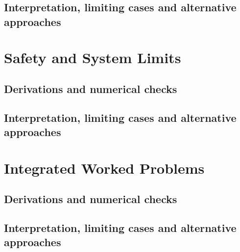 \subsection{Interpretation, limiting cases and alternative approaches}
\par\pagebreak[1]

\section{Safety and System Limits}
\label{sec:e:safety-and-system-limits}
\subsection{Derivations and numerical checks}
\subsection{Interpretation, limiting cases and alternative approaches}
\par\pagebreak[1]

\section{Integrated Worked Problems}
\label{sec:e:integrated-worked-problems}
\subsection{Derivations and numerical checks}
\subsection{Interpretation, limiting cases and alternative approaches}
\par\pagebreak[1]
